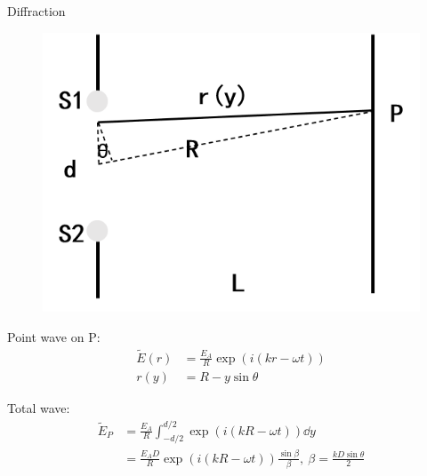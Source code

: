 \documentclass{beamer}
\begin{document}
\begin{frame}{Diffraction}
    \begin{figure}[htbp]
        \centering
        \includegraphics[scale=0.3]{images/diffraction.png}
    \end{figure} 
    
    Point wave on P:
    \begin{equation}
        \begin{split}
            \tilde{E}(r) &= \frac{E_A}{R}\exp(i(kr-\omega t)) \\
            r(y) &= R - y\sin\theta
        \end{split}
    \end{equation}

    Total wave:
    \begin{equation}
        \begin{split}
            \tilde{E}_P &= \frac{E_A}{R} \int_{-d/2}^{d/2} \exp(i(kR - \omega t)) \dd y \\ 
            &= \frac{E_A D}{R} \exp(i(kR-\omega t)) \frac{\sin\beta }{\beta} ,\ \beta = \frac{kD\sin\theta}{2}
        \end{split}
    \end{equation}

\end{frame}
\end{document}
